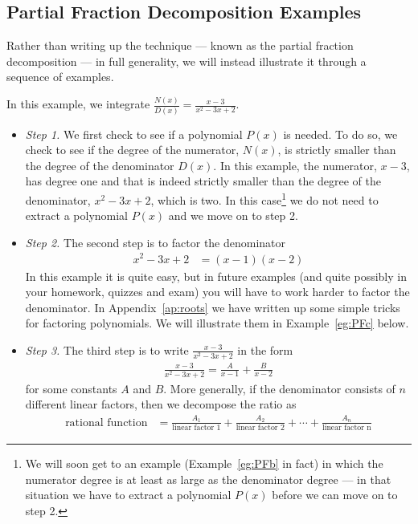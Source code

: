 \subsection{Partial Fraction Decomposition Examples}
Rather than writing up the technique --- known as the partial fraction decomposition ---
in full generality, we will instead illustrate it through a sequence of examples.

\begin{eg}\label{eg:PFa}
In this example, we integrate $\frac{N(x)}{D(x)}=\frac{x-3}{x^2-3x+2}$.

\soln
\begin{itemize}
 \item \emph{Step 1.} We first check to see if a polynomial $P(x)$ is needed. To do so,
we check to see if the degree of the numerator, $N(x)$, is strictly smaller than the
degree of the denominator $D(x)$.  In this example, the numerator, $x-3$, has degree one
and that is indeed strictly smaller than the degree of the denominator, $x^2-3x+2$, which
is two. In this case\footnote{We will soon get to an example (Example~\ref{eg:PFb} in
fact) in which the numerator degree is at least as large as the denominator degree --- in
that situation we have to extract a polynomial $P(x)$ before we can move on to step 2.} we
do not need to extract a polynomial $P(x)$ and we move on to step 2.

\item \emph{Step 2.}
The second step is to factor the denominator
\begin{align*}
x^2-3x+2&=(x-1)(x-2)
\end{align*}
In this example it is quite easy, but in future examples (and quite possibly in your
homework, quizzes and exam) you will have to work harder to factor the denominator. In
Appendix~\ref{ap:roots} we have written up some simple tricks for factoring polynomials.
We will illustrate them in Example~\ref{eg:PFc} below.

\item \emph{Step 3.}
The third step is to write $\frac{x-3}{x^2-3x+2}$
in the form
\begin{align*}
\frac{x-3}{x^2-3x+2}
=\frac{A}{x-1}+\frac{B}{x-2}
\end{align*}
for some constants $A$ and $B$. More generally, if the denominator consists of $n$
different linear factors, then we decompose the ratio as
\begin{align*}
  \text{rational function} &=
  \frac{A_1}{\text{linear factor 1}} +
  \frac{A_2}{\text{linear factor 2}} + \cdots +
  \frac{A_n}{\text{linear factor n}}
\end{align*}


\end{itemize}
\end{eg}
